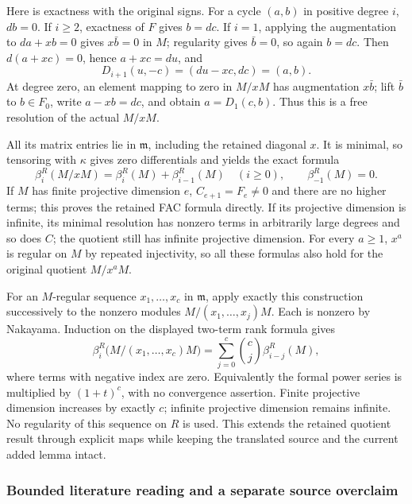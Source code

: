 Here is exactness with the original signs. For a cycle \((a,b)\) in positive degree \(i\), \(db=0\). If \(i\ge2\), exactness of \(F\) gives \(b=dc\). If \(i=1\), applying the augmentation to \(da+xb=0\) gives \(x\bar b=0\) in \(M\); regularity gives \(\bar b=0\), so again \(b=dc\). Then \(d(a+xc)=0\), hence \(a+xc=du\), and \[
D_{i+1}(u,-c)=(du-xc,dc)=(a,b).
\] At degree zero, an element mapping to zero in \(M/xM\) has augmentation \(x\bar b\); lift \(\bar b\) to \(b\in F_0\), write \(a-xb=dc\), and obtain \(a=D_1(c,b)\). Thus this is a free resolution of the actual \(M/xM\).

All its matrix entries lie in \(\mathfrak m\), including the retained diagonal \(x\). It is minimal, so tensoring with \(\kappa\) gives zero differentials and yields the exact formula \[
\beta_i^R(M/xM)=\beta_i^R(M)+\beta_{i-1}^R(M)
\quad(i\ge0),\qquad \beta_{-1}^R(M)=0 .
\] If \(M\) has finite projective dimension \(e\), \(C_{e+1}=F_e\ne0\) and there are no higher terms; this proves the retained FAC formula directly. If its projective dimension is infinite, its minimal resolution has nonzero terms in arbitrarily large degrees and so does \(C\); the quotient still has infinite projective dimension. For every \(a\ge1\), \(x^a\) is regular on \(M\) by repeated injectivity, so all these formulas also hold for the original quotient \(M/x^aM\).

For an \(M\)-regular sequence \(x_1,\ldots,x_c\) in \(\mathfrak m\), apply exactly this construction successively to the nonzero modules \(M/(x_1,\ldots,x_j)M\). Each is nonzero by Nakayama. Induction on the displayed two-term rank formula gives \[
\beta_i^R\bigl(M/(x_1,\ldots,x_c)M\bigr)
=\sum_{j=0}^c\binom cj\beta_{i-j}^R(M),
\] where terms with negative index are zero. Equivalently the formal power series is multiplied by \((1+t)^c\), with no convergence assertion. Finite projective dimension increases by exactly \(c\); infinite projective dimension remains infinite. No regularity of this sequence on \(R\) is used. This extends the retained quotient result through explicit maps while keeping the translated source and the current added lemma intact.

\subsubsection{Bounded literature reading and a separate source overclaim}\label{algebra-proof-023-bounded-literature-reading-and-a-separate-source-overclaim}

